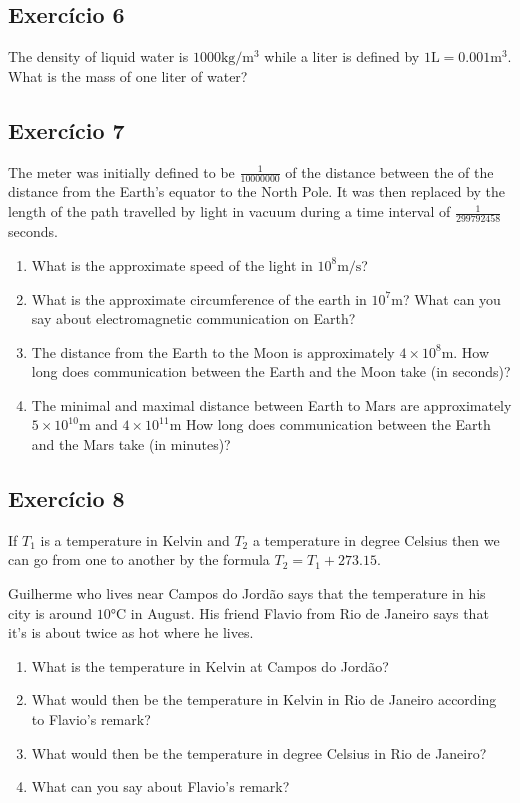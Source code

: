 \subsection*{Exercício 6}

The density of liquid water is $1000 \text{kg}/\text{m}^3$ while a liter is
defined by $1\text{L}=0.001 \text{m}^3$. What is the mass of one liter of
water?

\subsection*{Exercício 7}

The meter was initially defined to be $\frac{1}{10000000}$ of the distance
between the of the distance from the Earth's equator to the North Pole.
It was then replaced by the length of the path travelled by light in vacuum
during a time interval of $\frac{1}{299792458}$ seconds.

\begin{enumerate}
\item What is the approximate speed of the light in $10^8 \text{m}/\text{s}$?
\item What is the approximate circumference of the earth in $10^7 \text{m}$?
  What can you say about electromagnetic communication on Earth?
\item The distance from the Earth to the Moon is approximately
  $4\times10^8 \text{m}$. How long does communication between the Earth and
  the Moon take (in seconds)?
\item The minimal and maximal distance between Earth to Mars are approximately
  $5\times10^{10} \text{m}$ and $4 \times10^{11} \text{m}$
  How long does communication between the Earth and the Mars take (in minutes)?
\end{enumerate}

\subsection*{Exercício 8}

If $T_1$ is a temperature in Kelvin and $T_2$ a temperature in degree Celsius
then we can go from one to another by the formula $T_2 = T_1 + 273.15$.

Guilherme who lives near Campos do Jordão says that the temperature in his
city is around $10\text{°C}$ in August. His friend Flavio from Rio de Janeiro
says that it's is about twice as hot where he lives.

\begin{enumerate}
\item What is the temperature in Kelvin at Campos do Jordão?
\item What would then be the temperature in Kelvin in Rio de Janeiro according
  to Flavio's remark?
\item What would then be the temperature in degree Celsius in Rio de Janeiro?
\item What can you say about Flavio's remark?
\end{enumerate}

